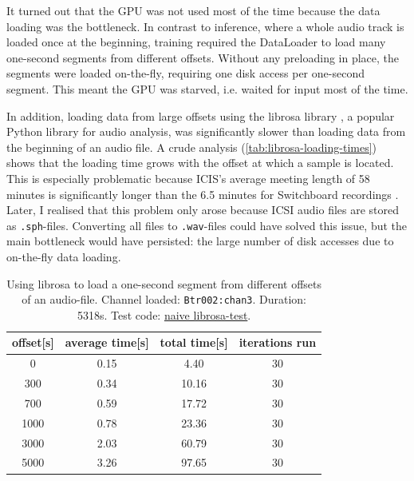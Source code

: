 \documentclass[bsc,frontabs,parskip,deptreport]{infthesis}
\begin{document}
It turned out that the GPU was not used most of the time because the data loading was the bottleneck. In contrast to inference, where a whole audio track is loaded once at the beginning, training required the DataLoader to load many one-second segments from different offsets. 
Without any preloading in place, the segments were loaded on-the-fly, requiring one disk access per one-second segment. This meant the GPU was starved, i.e. waited for input most of the time. 

In addition, loading data from large offsets using the librosa library \citep{mcfee2015librosa}, a popular Python library for audio analysis, was significantly slower than loading data from the beginning of an audio file. A crude analysis (\autoref{tab:librosa-loading-times}) shows that the loading time grows with the offset at which a sample is located. 
This is especially problematic because ICIS's average meeting length of 58 minutes \citep{icsi-ldc} is significantly longer than the 6.5 minutes for Switchboard recordings \citep{switchboard-ldc}.
Later, I realised that this problem only arose because ICSI audio files are stored as \verb|.sph|-files. Converting all files to \verb|.wav|-files could have solved this issue, but the main bottleneck would have persisted: the large number of disk accesses due to on-the-fly data loading.

\begin{table}[h!]
    \centering
    \begin{tabular}{|c|c|c|c|}
    \hline
    offset[s] & average time[s] & total time[s] & iterations run \\
    \hline
    0  & 0.15 & 4.40 & 30    \\
    300 & 0.34 & 10.16 & 30  \\ 
    700 & 0.59 & 17.72 & 30  \\
    1000 & 0.78 & 23.36 & 30 \\  
    3000 & 2.03 & 60.79 & 30 \\
    5000 & 3.26 & 97.65 & 30 \\
    \hline
    \end{tabular}
    \caption{Using librosa \citep{mcfee2015librosa} to load a one-second segment from different offsets of an audio-file. Channel loaded: \texttt{Btr002:chan3}. Duration: 5318s. Test code: \href{https://github.com/LasseWolter/laughter-detection-icsi/tree/main/misc_scripts}{naive librosa-test}.}
    \label{tab:librosa-loading-times}
\end{table}
\end{document}
